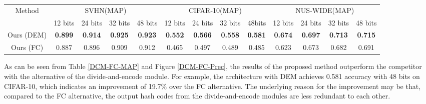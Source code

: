 \documentclass[10pt,twocolumn,letterpaper]{article}
\begin{document}
\begin{table*}[t]
\small
    \centering \caption{Comparison results of the divide-and-encode module and its fully-connected alternative on three datasets.}
    \begin{tabular}{|c|c c c c|c c c c|c c c c|}
         \hline
        \multirow{2}{*}{ Method } & \multicolumn{4}{|c}{SVHN(MAP)} &\multicolumn{4}{|c}{CIFAR-10(MAP)} & \multicolumn{4}{|c|}{NUS-WIDE(MAP)}\\
& 12 bits & 24 bits & 32 bits & 48 bits & 12 bits & 24 bits & 32 bits& 48bits & 12 bits & 24 bits &32 bits & 48 bits \\
        \hline
        Ours (DEM) & {\bf  0.899 } & {\bf 0.914} & {\bf 0.925 }&{\bf 0.923} & {\bf 0.552 }& {\bf 0.566} & {\bf 0.558} & {\bf 0.581}  & {\bf 0.674 }& {\bf 0.697} & {\bf 0.713} & {\bf 0.715}\\
         \hline
         Ours (FC) & 0.887 & 0.896 &  0.909 &0.912  & 0.465 & 0.497 & 0.489 & 0.485 & 0.623 & 0.673 & 0.682 & 0.691 \\
         \hline
        \end{tabular}
    \label{DCM-FC-MAP}
\end{table*}



\begin{figure*}[ht!]
  \begin{flushleft}
  \centering
  \caption{\footnotesize The precision curves of divide-and-encode module versus its fully-connected alternative with 48 bits w.r.t. different number of top returned samples}
  \label{DCM-FC-Prec}
  \end{flushleft}
\end{figure*}

 As can be seen from Table \ref{DCM-FC-MAP} and Figure \ref{DCM-FC-Prec}, the results of the proposed method outperform the competitor with the alternative of the divide-and-encode module. For example, the architecture with DEM achieves 0.581 accuracy with 48 bits on CIFAR-10, which indicates an improvement of 19.7$\%$ over the FC alternative. The underlying reason for the improvement may be that, compared to the FC alternative, the output hash codes from the divide-and-encode modules are less redundant to each other.
\end{document}

